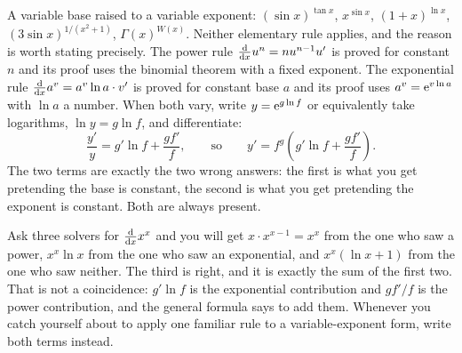 \cue A variable base raised to a variable exponent: $(\sin x)^{\tan x}$, $x^{\sin x}$, $(1+x)^{\ln x}$, $(3\sin x)^{1/(x^{2}+1)}$, $\Gamma(x)^{W(x)}$.
\method Neither elementary rule applies, and the reason is worth stating precisely. The power rule $\frac{\mathrm{d}}{\mathrm{d}x}u^{n}=nu^{n-1}u'$ is proved for constant $n$ and its proof uses the binomial theorem with a fixed exponent. The exponential rule $\frac{\mathrm{d}}{\mathrm{d}x}a^{v}=a^{v}\ln a\cdot v'$ is proved for constant base $a$ and its proof uses $a^{v}=\mathrm{e}^{v\ln a}$ with $\ln a$ a number. When both vary, write $y=\mathrm{e}^{g\ln f}$ or equivalently take logarithms, $\ln y=g\ln f$, and differentiate:
\[
\frac{y'}{y}=g'\ln f+\frac{gf'}{f},\qquad\text{so}\qquad y'=f^{g}\left(g'\ln f+\frac{gf'}{f}\right).
\]
The two terms are exactly the two wrong answers: the first is what you get pretending the base is constant, the second is what you get pretending the exponent is constant. Both are always present.

\begin{keynote}
Ask three solvers for $\frac{\mathrm{d}}{\mathrm{d}x}x^{x}$ and you will get $x\cdot x^{x-1}=x^{x}$ from the one who saw a power, $x^{x}\ln x$ from the one who saw an exponential, and $x^{x}(\ln x+1)$ from the one who saw neither. The third is right, and it is exactly the sum of the first two. That is not a coincidence: $g'\ln f$ is the exponential contribution and $gf'/f$ is the power contribution, and the general formula says to add them. Whenever you catch yourself about to apply one familiar rule to a variable-exponent form, write both terms instead.
\end{keynote}

